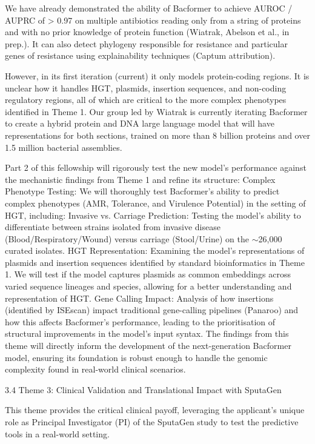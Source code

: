 We have already demonstrated the ability of Bacformer to achieve AUROC / AUPRC of > 0.97 on multiple antibiotics reading only from a string of proteins and with no prior knowledge of protein function (Wiatrak, Abelson et al., in prep.). It can also detect phylogeny responsible for resistance and particular genes of resistance using explainability techniques (Captum attribution).

However, in its first iteration (current) it only models protein-coding regions. It is unclear how it handles HGT, plasmids, insertion sequences, and non-coding regulatory regions, all of which are critical to the more complex phenotypes identified in Theme 1. Our group led by Wiatrak is currently iterating Bacformer to create a hybrid protein and DNA large language model that will have representations for both sections, trained on more than 8 billion proteins and over 1.5 million bacterial assemblies.

Part 2 of this fellowship will rigorously test the new model's performance against the mechanistic findings from Theme 1 and refine its structure:
Complex Phenotype Testing: We will thoroughly test Bacformer’s ability to predict complex phenotypes (AMR, Tolerance, and Virulence Potential) in the setting of HGT, including:
Invasive vs. Carriage Prediction: Testing the model's ability to differentiate between strains isolated from invasive disease (Blood/Respiratory/Wound) versus carriage (Stool/Urine) on the $\sim$26,000 curated isolates.
HGT Representation: Examining the model's representations of plasmids and insertion sequences identified by standard bioinformatics in Theme 1. We will test if the model captures plasmids as common embeddings across varied sequence lineages and species, allowing for a better understanding and representation of HGT.
Gene Calling Impact: Analysis of how insertions (identified by ISEscan) impact traditional gene-calling pipelines (Panaroo) and how this affects Bacformer’s performance, leading to the prioritisation of structural improvements in the model's input syntax.
The findings from this theme will directly inform the development of the next-generation Bacformer model, ensuring its foundation is robust enough to handle the genomic complexity found in real-world clinical scenarios.

3.4 Theme 3: Clinical Validation and Translational Impact with SputaGen

This theme provides the critical clinical payoff, leveraging the applicant’s unique role as Principal Investigator (PI) of the SputaGen study to test the predictive tools in a real-world setting.


